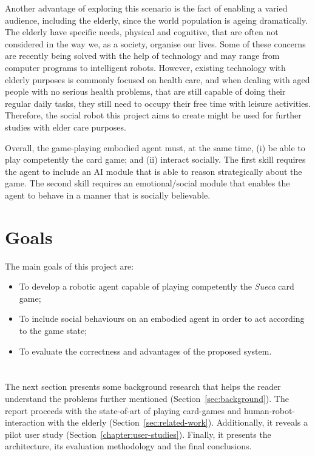 Another advantage of exploring this scenario is the fact of enabling a varied audience, including the elderly, since the world population is ageing dramatically.
The elderly have specific needs, physical and cognitive, that are often not considered in the way we, as a society, organise our lives.
Some of these concerns are recently being solved with the help of technology and may range from computer programs to intelligent robots.
However, existing technology with elderly purposes is commonly focused on health care, and when dealing with aged people with no serious health problems, that are still capable of doing their regular daily tasks, they still need to occupy their free time with leisure activities.
Therefore, the social robot this project aims to create might be used for further studies with elder care purposes.

Overall, the game-playing embodied agent must, at the same time, (i) be able to play competently the card game; and (ii) interact socially. The first skill requires the agent to include an AI module that is able to reason strategically about the game. The second skill requires an emotional/social module that enables the agent to behave in a manner that is socially believable.


\section{Goals}
\label{sec:goals}

The main goals of this project are:
\begin{itemize}
\item To develop a robotic agent capable of playing competently the \emph{Sueca} card game;
\item To include social behaviours on an embodied agent in order to act according to the game state;
\item To evaluate the correctness and advantages of the proposed system.
\end{itemize}

\section*{\centering*}

The next section presents some background research that helps the reader understand the problems further mentioned (Section~\ref{sec:background}).
The report proceeds with the state-of-art of playing card-games and human-robot-interaction with the elderly (Section~\ref{sec:related-work}).
Additionally, it reveals a pilot user study (Section~\ref{chapter:user-studies}).
Finally, it presents the architecture, its evaluation methodology and the final conclusions.
